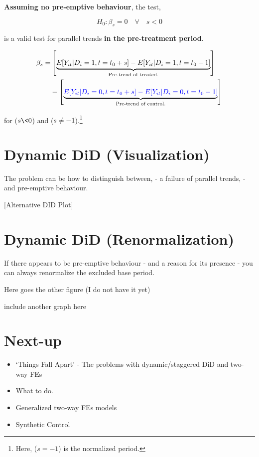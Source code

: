 \documentclass[
  letterpaper,
  DIV=11,
  numbers=noendperiod]{scrreprt}
\providecommand{\tightlist}{%
  \setlength{\itemsep}{0pt}\setlength{\parskip}{0pt}}\usepackage{longtable,booktabs,array}
\theoremstyle{definition}
\theoremstyle{remark}
\begin{document}
\begin{enumerate}
  \textbf{Assuming no pre-emptive behaviour}, the test,

  \[
  H_0: \beta_s = 0 \quad \forall \quad s < 0
  \]

  is a valid test for parallel trends \textbf{in the pre-treatment
  period}.

  \[
  \begin{aligned}
  \beta_s = & \left[\underbrace{E[Y_{it}|D_i = 1, t = t_0 + s] - E[Y_{it}|D_i = 1, t = t_0 - 1]}_{\text{Pre-trend of treated.}}\right] \\
  & - \left[\underbrace{\textcolor{blue}{E[Y_{it}|D_i = 0, t = t_0 + s] - E[Y_{it}|D_i = 0, t = t_0 - 1]}}_{\text{Pre-trend of control.}}\right]
  \end{aligned}
  \]

  for (\(s \< 0\)) and (\(s \neq -1\)).\footnote{Here, (\(s=-1\)) is the
    normalized period.}

  \section{Dynamic DiD (Visualization)}\label{dynamic-did-visualization}

  The problem can be how to distinguish between, - a failure of parallel
  trends, - and pre-emptive behaviour.

  {[}Alternative DID Plot{]}

  \section{Dynamic DiD
  (Renormalization)}\label{dynamic-did-renormalization}

  If there appears to be pre-emptive behaviour - and a reason for its
  presence - you can always renormalize the excluded base period.

  Here goes the other figure (I do not have it yet)

  include another graph here

  \section{Next-up}\label{next-up-2}

  \begin{itemize}
  \tightlist
  \item
    `Things Fall Apart' - The problems with dynamic/staggered DiD and
    two-way FEs
  \item
    What to do.
  \item
    Generalized two-way FEs models
  \item
    Synthetic Control
  \end{itemize}


\end{enumerate}
\end{document}
